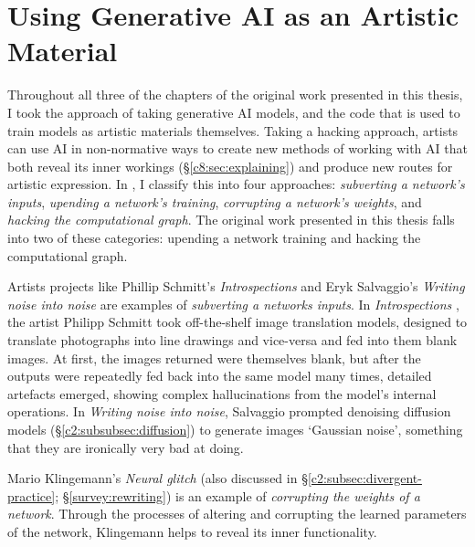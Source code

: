 \section{Using Generative AI as an Artistic Material}
\label{c8:sec:material}
Throughout all three of the chapters of the original work presented in this thesis, I took the approach of taking generative AI models, and the code that is used to train models as artistic materials themselves.
Taking a hacking approach, artists can use AI in non-normative ways to create new methods of working with AI that both reveal its inner workings (\S \ref{c8:sec:explaining}) and produce new routes for artistic expression. 
In \citep{broad2024using}, I classify this into four approaches: \textit{subverting a network's inputs}, \textit{upending a network's training}, \textit{corrupting a network's weights}, and \textit{hacking the computational graph}. 
The original work presented in this thesis falls into two of these categories: upending a network training and hacking the computational graph.

Artists projects like Phillip Schmitt's \textit{Introspections} \citep{schmitt2019introspections} and Eryk Salvaggio's \textit{Writing noise into noise} \citep{salvaggio2023noise} are examples of \textit{subverting a networks inputs}. 
In \textit{Introspections} \cite{schmitt2019introspections}, the artist Philipp Schmitt took off-the-shelf image translation models, designed to translate photographs into line drawings and vice-versa and fed into them blank images. At first, the images returned were themselves blank, but after the outputs were repeatedly fed back into the same model many times, detailed artefacts emerged, showing complex hallucinations from the model's internal operations.
In \textit{Writing noise into noise}, Salvaggio prompted denoising diffusion models (\S \ref{c2:subsubsec:diffusion}) to generate images `Gaussian noise', something that they are ironically very bad at doing.

Mario Klingemann's \textit{Neural glitch} (also discussed in \S \ref{c2:subsec:divergent-practice}; \S \ref{survey:rewriting}) is an example of \textit{corrupting the weights of a network}. 
Through the processes of altering and corrupting the learned parameters of the network, Klingemann helps to reveal its inner functionality.

